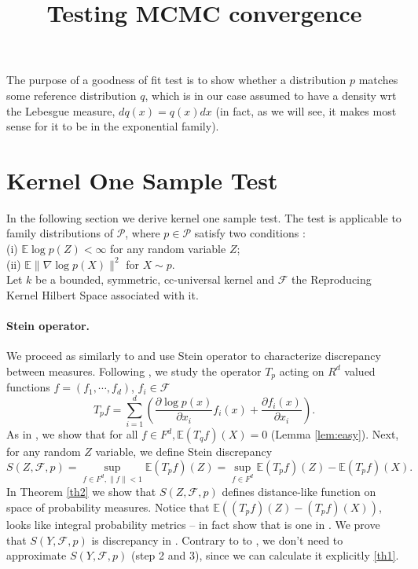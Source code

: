 \documentclass{article}
\title{Testing MCMC convergence}
\author{}
\date{}
\newcommand{\ev}{\mathbb{E}}
\begin{document}
\maketitle

The purpose of a goodness of fit test is to show whether a distribution
$p$ matches some reference distribution $q$, which is in our case
assumed to have a density wrt the Lebesgue measure, $dq(x)=q(x)dx$
(in fact, as we will see, it makes most sense for it to be in the
exponential family).

\section{Kernel One Sample Test}
In the following section we derive kernel one sample test. The test is applicable to family distributions of $\mathcal{P}$, where $p \in \mathcal{P}$ satisfy two conditions : \\ 
(i) $\ev \log p(Z)    <\infty$ for any random variable $Z$; \\
(ii) $\ev   \| \nabla \log p(X) \|^2  $  for $X \sim p$.\\
Let $k$ be a bounded, symmetric, cc-universal \cite{sriperumbudur2011universality}  kernel  and $\mathcal{F}$  the Reproducing Kernel Hilbert Space  associated with it. 


\paragraph{Stein operator.}
We proceed as similarly to \cite{mackey2015multivariate,stein1972} and use Stein operator to characterize discrepancy between measures. Following \cite{mackey2015multivariate}, we study the operator $T_p$ acting on $R^d$ valued functions $f = (f_1,\cdots,f_d)$, $f_i \in \mathcal{F}$ 
\[
T_{p} f=  \sum_{i=1}^{d} \left( \frac{\partial \log p(x)}{ \partial x_i} f_i(x)+\frac{\partial f_i(x)}{ \partial x_i} \right).
\]
As in \cite{mackey2015multivariate}, we show that for all $f \in F^d, \ev (T_{q}f)(X) = 0$ (Lemma \ref{lem:easy}). Next, for any random $Z$ variable, we define Stein discrepancy 
\[
 S(Z,\mathcal{F},p) = \sup_{f \in F^d,\| f \|<1} \ev (T_{p}f) (Z)  = \sup_{ f \in F^d } \ev (T_{p}f)(Z) - \ev (T_{p}f) (X).
\]
In Theorem \ref{th2} we show that  $S(Z,\mathcal{F},p)$ defines distance-like function on space of probability measures. 
Notice that $\ev \left(  (T_{p}f)(Z) -  (T_{p}f) (X) \right) $, looks like integral probability metrics \cite{muller1997integral} -- in fact show that is one in .  
We prove that  $S(Y,\mathcal{F},p)$ is discrepancy in . Contrary to to \cite{mackey2015multivariate}, we don't need to approximate $S(Y,\mathcal{F},p)$ (step 2 and 3), since we can calculate it explicitly \ref{th1}. 
\end{document}
